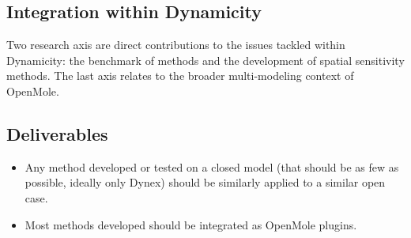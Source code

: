 \subsection{Integration within Dynamicity}

Two research axis are direct contributions to the issues tackled within Dynamicity: the benchmark of methods and the development of spatial sensitivity methods. The last axis relates to the broader multi-modeling context of OpenMole.

\subsection{Deliverables} 

\begin{itemize}
\item Any method developed or tested on a closed model (that should be as few as possible, ideally only Dynex) should be similarly applied to a similar open case.
\item Most methods developed should be integrated as OpenMole plugins.
\end{itemize}













